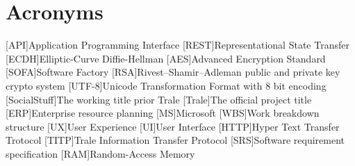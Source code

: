 

\chapter{Acronyms}\label{ch:acronyms}
\begin{acronym}
    [API]{Application Programming Interface}
    [REST]{Representational State Transfer}
    [ECDH]{Elliptic-Curve Diffie-Hellman}
    [AES]{Advanced Encryption Standard}
    [SOFA]{Software Factory}
    [RSA]{Rivest–Shamir–Adleman public and private key crypto system}
    [UTF-8]{Unicode Transformation Format with 8 bit encoding}
    [SocialStuff]{The working title prior Trale}
    [Trale]{The official project title}
    [ERP]{Enterprise resource planning}
    [MS]{Microsoft}
    [WBS]{Work breakdown structure}
    [UX]{User Experience}
    [UI]{User Interface}
    [HTTP]{Hyper Text Transfer Trotocol}
    [TITP]{Trale Information Transfer Protocol}
    [SRS]{Software requirement specification}
    [RAM]{Random-Access Memory}
\end{acronym}
